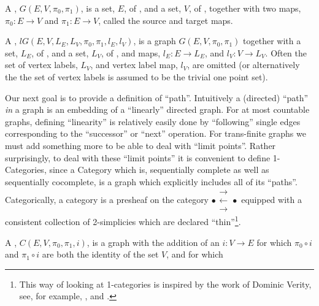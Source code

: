 \documentclass[a4paper,openany]{amsart}
\begin{document}
\begin{definition}

A , $G(E, V, \pi_0, \pi_1)$, is a set, $E$, of
, and a set, $V$, of , together with two maps, $\pi_0
: E \rightarrow V$ and $\pi_1 : E \rightarrow V$, called the source and target maps.

A , $lG(E, V, L_E, L_V, \pi_0, \pi_1, l_E, l_V)$, is a graph $G(E, 
V, \pi_0, \pi_1)$ together with a set, $L_E$, of , and a set, $L_V$, 
of , and maps, $l_E : E \rightarrow L_E$, and $l_V : V \rightarrow 
L_V$. Often the set of vertex labels, $L_V$, and vertex label map, $l_V$, are omitted (or 
alternatively the the set of vertex labels is assumed to be the trivial one point set).

\end{definition}

Our next goal is to provide a definition of ``path''. Intuitively a (directed) ``path''
\emph{in} a graph is an embedding of a ``linearly'' directed graph. For at most countable
graphs, defining ``linearity'' is relatively easily done by ``following'' single edges
corresponding to the ``successor'' or ``next'' operation. For trans-finite graphs we must
add something more to be able to deal with ``limit points''. Rather surprisingly, to deal
with these ``limit points'' it is convenient to define 1-Categories, since a Category
which is, sequentially complete as well as sequentially cocomplete, is a graph which
explicitly includes all of its ``paths''. Categorically, a category is a presheaf on the
category $ \bullet \substack{\mathbf{\longrightarrow} \\[-0.7ex] \mathbf{\longleftarrow} 
\\[-0.7ex] \mathbf{\longrightarrow} } \bullet $ equipped with a consistent collection of
2-simplicies which are declared ``thin''\footnote{This way of looking at 1-categories is
inspired by the work of Dominic Verity, see, for example, \cite{verity2005complicialSets},
\cite{verity2006complicialSimplicialHomotopy} and
\cite{verity2006simplicialComplicialCategories}.}.

\begin{definition}

A , $C(E, V, \pi_0, \pi_1, i)$, is a graph with the addition of an 
 $i : V \rightarrow E$ for which $\pi_0 \circ i$ and $\pi_1 
\circ i$ are both the identity of the set $V$, and for which 

\end{definition}
\end{document}
